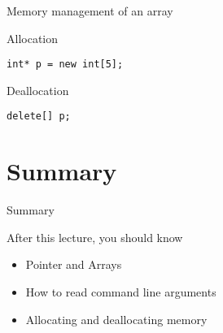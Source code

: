 \documentclass[12pt,t]{beamer}
\begin{document}
\begin{frame}[fragile]{Memory management of an array}

\begin{block}{Allocation}
\begin{lstlisting}
int* p = new int[5];
\end{lstlisting}
\end{block}

\begin{block}{Deallocation}
\begin{lstlisting}
delete[] p;
\end{lstlisting}
\end{block}


\end{frame}

\section{Summary}
\begin{frame}{Summary}
\begin{block}{After this lecture, you should know}
\begin{itemize}
\item Pointer and Arrays
\item How to read command line arguments
\item Allocating and deallocating memory
\end{itemize}
\end{block}
\end{frame}
\end{document}
